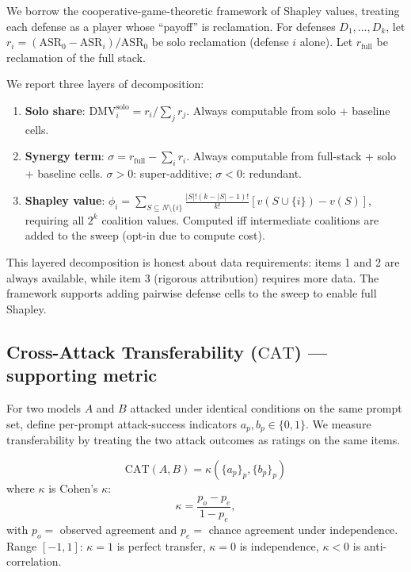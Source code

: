 \documentclass[11pt,letterpaper]{article}
\newcommand{\DMV}{\mathrm{DMV}}
\newcommand{\CAT}{\mathrm{CAT}}
\newcommand{\ASR}{\mathrm{ASR}}
\begin{document}
We borrow the cooperative-game-theoretic framework of Shapley values,
treating each defense as a player whose ``payoff'' is reclamation. For
defenses $D_1, \dots, D_k$, let $r_i = (\ASR_0 - \ASR_i) / \ASR_0$ be
solo reclamation (defense $i$ alone). Let $r_{\text{full}}$ be reclamation
of the full stack.

\begin{definition}
We report three layers of decomposition:
\begin{enumerate}
  \item \textbf{Solo share}: $\DMV^{\text{solo}}_i = r_i / \sum_j r_j$.
        Always computable from solo + baseline cells.
  \item \textbf{Synergy term}: $\sigma = r_{\text{full}} - \sum_i r_i$.
        Always computable from full-stack + solo + baseline cells.
        $\sigma > 0$: super-additive; $\sigma < 0$: redundant.
  \item \textbf{Shapley value}: $\phi_i = \sum_{S \subseteq N\setminus\{i\}}
        \frac{|S|!(k-|S|-1)!}{k!} [v(S \cup \{i\}) - v(S)]$, requiring
        all $2^k$ coalition values. Computed iff intermediate coalitions
        are added to the sweep (opt-in due to compute cost).
\end{enumerate}
\end{definition}

This layered decomposition is honest about data requirements: items 1 and
2 are always available, while item 3 (rigorous attribution) requires more
data. The framework supports adding pairwise defense cells to the sweep
to enable full Shapley.

\subsection{Cross-Attack Transferability ($\CAT$) — supporting metric}

For two models $A$ and $B$ attacked under identical conditions on the same
prompt set, define per-prompt attack-success indicators
$a_p, b_p \in \{0, 1\}$. We measure transferability by treating the two
attack outcomes as ratings on the same items.

\begin{definition}
\[
  \CAT(A, B) = \kappa(\{a_p\}_p, \{b_p\}_p)
\]
where $\kappa$ is Cohen's $\kappa$:
\[
  \kappa = \frac{p_o - p_e}{1 - p_e},
\]
with $p_o = $ observed agreement and $p_e = $ chance agreement under
independence. Range $[-1, 1]$: $\kappa = 1$ is perfect transfer,
$\kappa = 0$ is independence, $\kappa < 0$ is anti-correlation.
\end{definition}
\end{document}
